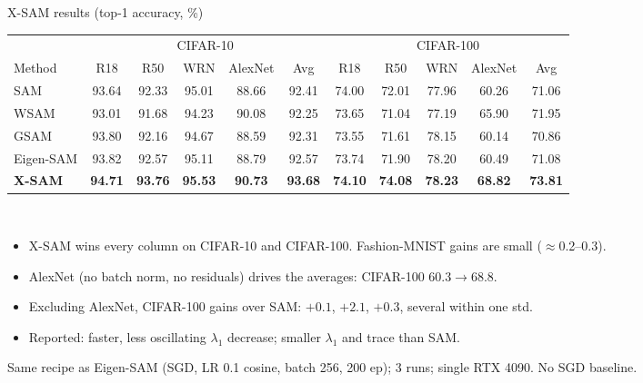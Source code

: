 \documentclass[aspectratio=169,10pt]{beamer}
\newcommand{\sh}[1]{\textcolor{sharp}{#1}}
\newcommand{\mt}[1]{\textcolor{muted}{#1}}
\newcommand{\source}[1]{\par\vfill{\scriptsize\mt{#1}}}
\newcommand{\best}[1]{\textbf{#1}}
\begin{document}
\begin{frame}{X-SAM results (top-1 accuracy, \%)}
\centering\footnotesize
\setlength{\tabcolsep}{4.5pt}
\renewcommand{\arraystretch}{1.1}
\begin{tabular}{@{}lccccc@{\hspace{1.2em}}ccccc@{}}
\toprule
& \multicolumn{5}{c}{CIFAR-10} & \multicolumn{5}{c}{CIFAR-100}\\
\cmidrule(lr){2-6}\cmidrule(lr){7-11}
Method & R18 & R50 & WRN & AlexNet & Avg & R18 & R50 & WRN & AlexNet & Avg\\
\midrule
SAM & 93.64 & 92.33 & 95.01 & 88.66 & 92.41 & 74.00 & 72.01 & 77.96 & 60.26 & 71.06\\
WSAM & 93.01 & 91.68 & 94.23 & 90.08 & 92.25 & 73.65 & 71.04 & 77.19 & 65.90 & 71.95\\
GSAM & 93.80 & 92.16 & 94.67 & 88.59 & 92.31 & 73.55 & 71.61 & 78.15 & 60.14 & 70.86\\
Eigen-SAM & 93.82 & 92.57 & 95.11 & 88.79 & 92.57 & 73.74 & 71.90 & 78.20 & 60.49 & 71.08\\
\textbf{X-SAM} & \best{94.71} & \best{93.76} & \best{95.53} & \best{90.73} & \best{93.68} & \best{74.10} & \best{74.08} & \best{78.23} & \best{68.82} & \best{73.81}\\
\bottomrule
\end{tabular}\\[6pt]
\raggedright
\begin{itemize}\small\setlength{\itemsep}{0.2em}
  \item X-SAM wins every column on CIFAR-10 and CIFAR-100. \;Fashion-MNIST gains are small ($\approx$0.2--0.3).
  \item \sh{AlexNet} (no batch norm, no residuals) drives the averages: CIFAR-100 $60.3\to68.8$.
  \item Excluding AlexNet, CIFAR-100 gains over SAM: $+0.1$, $+2.1$, $+0.3$, several within one std.
  \item Reported: faster, less oscillating $\lambda_1$ decrease; smaller $\lambda_1$ and trace than SAM.
\end{itemize}
\source{Same recipe as Eigen-SAM (SGD, LR 0.1 cosine, batch 256, 200 ep); 3 runs; single RTX 4090. No SGD baseline.}
\end{frame}
\end{document}
